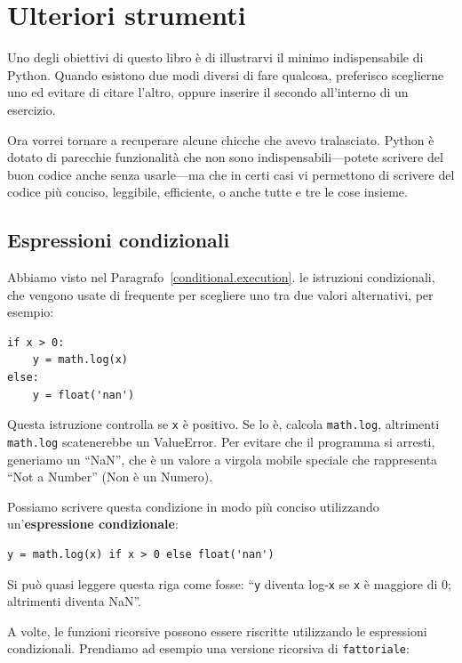 \documentclass[10pt]{book}
\begin{document}
\chapter{Ulteriori strumenti}

Uno degli obiettivi di questo libro è di illustrarvi il minimo indispensabile di Python. Quando esistono due modi diversi di fare qualcosa, preferisco sceglierne uno ed evitare di citare l'altro, oppure inserire il secondo all'interno di un esercizio.

Ora vorrei tornare a recuperare alcune chicche che avevo tralasciato. Python è dotato di parecchie funzionalità che non sono indispensabili---potete scrivere del buon codice anche senza usarle---ma che in certi casi vi permettono di scrivere del codice più conciso, leggibile, efficiente, o anche tutte e tre le cose insieme.


\section{Espressioni condizionali}

Abbiamo visto nel Paragrafo~\ref{conditional.execution}.
le istruzioni condizionali, che vengono usate di frequente per scegliere uno tra due valori alternativi, per esempio:

\begin{verbatim}
if x > 0:
    y = math.log(x)
else:
    y = float('nan')
\end{verbatim}

Questa istruzione controlla se {\tt x} è positivo. Se lo è, calcola
{\tt math.log}, altrimenti {\tt math.log} scatenerebbe un ValueError.  Per evitare che il programma si arresti, generiamo un ``NaN'', che è un valore a virgola mobile speciale che rappresenta ``Not a Number'' (Non è un Numero).

Possiamo scrivere questa condizione in modo più conciso utilizzando un'{\bf espressione condizionale}:

\begin{verbatim}
y = math.log(x) if x > 0 else float('nan')
\end{verbatim}

Si può quasi leggere questa riga come fosse: ``{\tt y} diventa log-{\tt x}
se {\tt x} è maggiore di 0; altrimenti diventa NaN''.

A volte, le funzioni ricorsive possono essere riscritte utilizzando le espressioni  condizionali. Prendiamo ad esempio una versione ricorsiva di {\tt fattoriale}:
\end{document}
